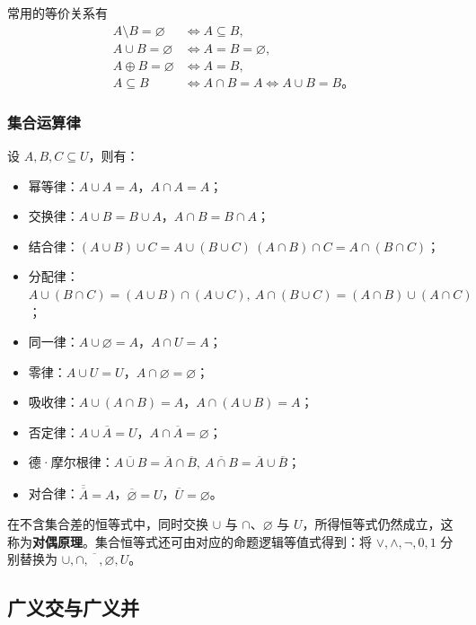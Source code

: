 常用的等价关系有
\begin{align*}
	A \setminus B = \varnothing & \iff A \subseteq B, \\
	A \cup B = \varnothing & \iff A = B = \varnothing, \\
	A \oplus B = \varnothing & \iff A = B, \\
	A \subseteq B & \iff A \cap B = A \iff A \cup B = B。
\end{align*}

\subsubsection{集合运算律}

设 $A, B, C \subseteq U$，则有：

\begin{itemize}
	\item 幂等律：$A \cup A = A$，$A \cap A = A$；
	\item 交换律：$A \cup B = B \cup A$，$A \cap B = B \cap A$；
	\item 结合律：$(A \cup B) \cup C = A \cup (B \cup C)\ (A \cap B) \cap C = A \cap (B \cap C)$；
	\item 分配律：$A \cup (B \cap C) = (A \cup B) \cap (A \cup C),\ A \cap (B \cup C) = (A \cap B) \cup (A \cap C)$；
	\item 同一律：$A \cup \varnothing = A$，$A \cap U = A$；
	\item 零律：$A \cup U = U$，$A \cap \varnothing = \varnothing$；
	\item 吸收律：$A \cup (A \cap B) = A$，$A \cap (A \cup B) = A$；
	\item 否定律：$A \cup \overline{A} = U$，$A \cap \overline{A} = \varnothing$；
	\item 德·摩尔根律：$\overline{A \cup B} = \overline{A} \cap \overline{B},\ \overline{A \cap B} = \overline{A} \cup \overline{B}$；
	\item 对合律：$\overline{\overline{A}} = A$，$\overline{\varnothing} = U$，$\overline{U} = \varnothing$。
\end{itemize}

在不含集合差的恒等式中，同时交换 $\cup$ 与 $\cap$、$\varnothing$ 与 $U$，所得恒等式仍然成立，这称为\textbf{对偶原理}。集合恒等式还可由对应的命题逻辑等值式得到：将 $\lor, \land, \lnot, 0, 1$ 分别替换为 $\cup, \cap, \overline{\phantom{A}}, \varnothing, U$。

\subsection{广义交与广义并}

